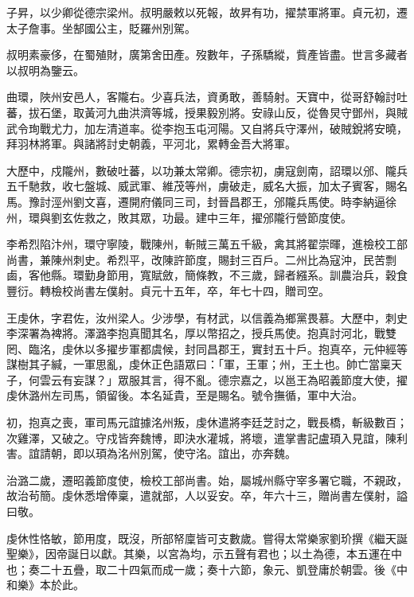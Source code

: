\begin{pinyinscope}
 子昇，以少卿從德宗梁州。叔明嚴敕以死報，故昇有功，擢禁軍將軍。貞元初，遷太子詹事。坐郜國公主，貶羅州別駕。



 叔明素豪侈，在蜀殖財，廣第舍田產。歿數年，子孫驕縱，貲產皆盡。世言多藏者以叔明為鑒云。



 曲環，陜州安邑人，客隴右。少喜兵法，資勇敢，善騎射。天寶中，從哥舒翰討吐蕃，拔石堡，取黃河九曲洪濟等城，授果毅別將。安祿山反，從魯炅守鄧州，與賊武令珣戰尤力，加左清道率。從李抱玉屯河陽。又自將兵守澤州，破賊銳將安曉，拜羽林將軍。與諸將討史朝義，平河北，累轉金吾大將軍。



 大歷中，戍隴州，數破吐蕃，以功兼太常卿。德宗初，虜寇劍南，詔環以邠、隴兵五千馳救，收七盤城、威武軍、維茂等州，虜破走，威名大振，加太子賓客，賜名馬。豫討涇州劉文喜，遷開府儀同三司，封晉昌郡王，邠隴兵馬使。時李納逼徐州，環與劉玄佐救之，敗其眾，功最。建中三年，擢邠隴行營節度使。



 李希烈陷汴州，環守寧陵，戰陳州，斬賊三萬五千級，禽其將翟崇暉，進檢校工部尚書，兼陳州刺史。希烈平，改陳許節度，賜封三百戶。二州比為寇沖，民苦剽鹵，客他縣。環勤身節用，寬賦斂，簡條教，不三歲，歸者繦系。訓農治兵，穀食豐衍。轉檢校尚書左僕射。貞元十五年，卒，年七十四，贈司空。



 王虔休，字君佐，汝州梁人。少涉學，有材武，以信義為鄉黨畏慕。大歷中，刺史李深署為裨將。澤潞李抱真聞其名，厚以幣招之，授兵馬使。抱真討河北，戰雙罔、臨洺，虔休以多擢步軍都虞候，封同昌郡王，實封五十戶。抱真卒，元仲經等謀樹其子緘，一軍思亂，虔休正色語眾曰：「軍，王軍；州，王土也。帥亡當稟天子，何雲云有妄謀？」眾服其言，得不亂。德宗嘉之，以邕王為昭義節度大使，擢虔休潞州左司馬，領留後。本名延貴，至是賜名。號令撫循，軍中大治。



 初，抱真之喪，軍司馬元誼據洺州叛，虔休遣將李廷芝討之，戰長橋，斬級數百；次雞澤，又破之。守戍皆奔魏博，即決水灌城，將壞，遣掌書記盧頊入見誼，陳利害。誼請朝，即以頊為洺州別駕，使守洺。誼出，亦奔魏。



 治潞二歲，遷昭義節度使，檢校工部尚書。始，屬城州縣守宰多署它職，不親政，故治茍簡。虔休悉增俸稟，遣就部，人以妥安。卒，年六十三，贈尚書左僕射，謚曰敬。



 虔休性恪敏，節用度，既沒，所部帑廩皆可支數歲。嘗得太常樂家劉玠撰《繼天誕聖樂》，因帝誕日以獻。其樂，以宮為均，示五聲有君也；以土為德，本五運在中也；奏二十五疊，取二十四氣而成一歲；奏十六節，象元、凱登庸於朝雲。後《中和樂》本於此。




\end{pinyinscope}
